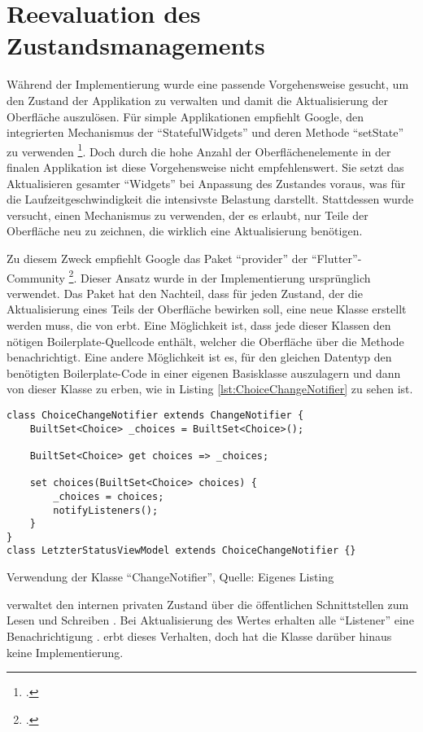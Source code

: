  
\section{Reevaluation des Zustandsmanagements}
\label{sec:Reevaluation-des-Zustandsmanagements}


Während der Implementierung wurde eine passende Vorgehensweise gesucht,
um den Zustand der Applikation zu verwalten
und damit die Aktualisierung der Oberfläche auszulösen.
Für simple Applikationen empfiehlt Google, den integrierten Mechanismus der \enquote{StatefulWidgets} und deren Methode \enquote{setState} zu verwenden \footcite[Vgl.][]{AddingInteractivityToYourFlutterApp}.
Doch durch die hohe Anzahl der Oberflächenelemente in der finalen Applikation ist diese Vorgehensweise nicht empfehlenswert.
Sie setzt das Aktualisieren gesamter \enquote{Widgets} bei Anpassung des Zustandes voraus,
was für die Laufzeitgeschwindigkeit die intensivste Belastung darstellt.
Stattdessen wurde versucht,
einen Mechanismus zu verwenden,
der es erlaubt,
nur Teile der Oberfläche neu zu zeichnen,
die wirklich eine Aktualisierung benötigen.

Zu diesem Zweck empfiehlt Google das Paket \enquote{provider} der \enquote{Flutter}-Community \footcite[Vgl.][]{ProviderARecommendedApproach}.
Dieser Ansatz wurde in der Implementierung ursprünglich verwendet.
Das Paket hat den Nachteil,
dass für jeden Zustand,
der die Aktualisierung eines Teils der Oberfläche bewirken soll,
eine neue Klasse erstellt werden muss, die von  erbt.
Eine Möglichkeit ist,
dass jede dieser Klassen den nötigen Boilerplate-Quellcode enthält,
welcher die Oberfläche über die Methode  benachrichtigt.
Eine andere Möglichkeit ist es, für den gleichen Datentyp den benötigten Boilerplate-Code in einer eigenen Basisklasse auszulagern
und dann von dieser Klasse zu erben, wie in Listing \ref{lst:ChoiceChangeNotifier} zu sehen ist.
\ifIncludeFigures
  \begin{listing}[h]
    \begin{verbatim}
class ChoiceChangeNotifier extends ChangeNotifier {
    BuiltSet<Choice> _choices = BuiltSet<Choice>();

    BuiltSet<Choice> get choices => _choices;

    set choices(BuiltSet<Choice> choices) {
        _choices = choices;
        notifyListeners();
    }
}
class LetzterStatusViewModel extends ChoiceChangeNotifier {}
\end{verbatim}
    \caption[Verwendung der Klasse \enquote{ChangeNotifier}]{Verwendung der Klasse \enquote{ChangeNotifier}, Quelle: Eigenes Listing}
    \label{lst:ChoiceChangeNotifier}
  \end{listing}
\fi
{} verwaltet den internen privaten Zustand   über die öffentlichen Schnittstellen zum Lesen  und Schreiben .
Bei Aktualisierung des Wertes erhalten alle \enquote{Listener} eine Benachrichtigung .
 erbt dieses Verhalten, doch hat die Klasse darüber hinaus keine Implementierung.

